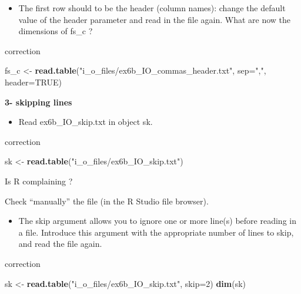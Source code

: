 \documentclass[]{book}
\newenvironment{Shaded}{\begin{snugshade}}{\end{snugshade}}
\newcommand{\DataTypeTok}[1]{\textcolor[rgb]{0.13,0.29,0.53}{#1}}
\newcommand{\DecValTok}[1]{\textcolor[rgb]{0.00,0.00,0.81}{#1}}
\newcommand{\KeywordTok}[1]{\textcolor[rgb]{0.13,0.29,0.53}{\textbf{#1}}}
\newcommand{\NormalTok}[1]{#1}
\newcommand{\OtherTok}[1]{\textcolor[rgb]{0.56,0.35,0.01}{#1}}
\newcommand{\StringTok}[1]{\textcolor[rgb]{0.31,0.60,0.02}{#1}}
\providecommand{\tightlist}{%
  \setlength{\itemsep}{0pt}\setlength{\parskip}{0pt}}
\begin{document}
\begin{itemize}
\tightlist
\item
  The first row should to be the header (column names): change the default value of the header parameter and read in the file again.
  What are now the dimensions of fs\_c ?
\end{itemize}

correction

\begin{Shaded}
\begin{Highlighting}[]
\NormalTok{fs_c <-}\StringTok{ }\KeywordTok{read.table}\NormalTok{(}\StringTok{"i_o_files/ex6b_IO_commas_header.txt"}\NormalTok{, }
                   \DataTypeTok{sep=}\StringTok{","}\NormalTok{, }
                   \DataTypeTok{header=}\OtherTok{TRUE}\NormalTok{)}
\end{Highlighting}
\end{Shaded}

\textbf{3- skipping lines}

\begin{itemize}
\tightlist
\item
  Read ex6b\_IO\_skip.txt in object sk.
\end{itemize}

correction

\begin{Shaded}
\begin{Highlighting}[]
\NormalTok{sk <-}\StringTok{ }\KeywordTok{read.table}\NormalTok{(}\StringTok{"i_o_files/ex6b_IO_skip.txt"}\NormalTok{)}
\end{Highlighting}
\end{Shaded}

Is R complaining ?

Check ``manually'' the file (in the R Studio file browser).

\begin{itemize}
\tightlist
\item
  The skip argument allows you to ignore one or more line(s) before reading in a file. Introduce this argument with the appropriate number of lines to skip, and read the file again.
\end{itemize}

correction

\begin{Shaded}
\begin{Highlighting}[]
\NormalTok{sk <-}\StringTok{ }\KeywordTok{read.table}\NormalTok{(}\StringTok{"i_o_files/ex6b_IO_skip.txt"}\NormalTok{,}
                 \DataTypeTok{skip=}\DecValTok{2}\NormalTok{)}
\KeywordTok{dim}\NormalTok{(sk)}
\end{Highlighting}
\end{Shaded}
\end{document}
